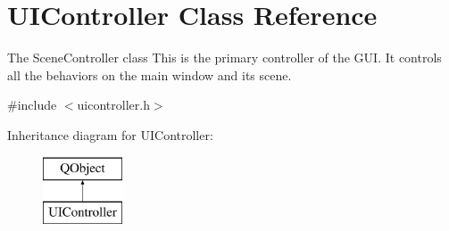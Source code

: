 \hypertarget{class_u_i_controller}{}\section{U\+I\+Controller Class Reference}
\label{class_u_i_controller}


The Scene\+Controller class This is the primary controller of the G\+U\+I. It controls all the behaviors on the main window and its scene.  




{\ttfamily \#include $<$uicontroller.\+h$>$}

Inheritance diagram for U\+I\+Controller\+:\begin{figure}[H]
\begin{center}
\leavevmode
\includegraphics[height=2.000000cm]{class_u_i_controller}
\end{center}
\end{figure}
